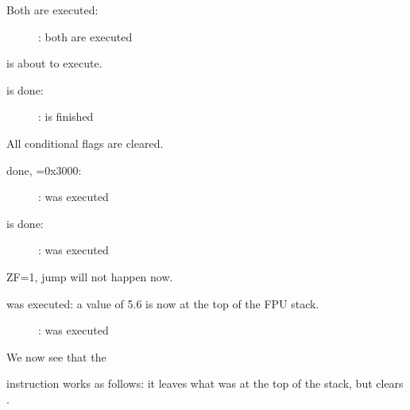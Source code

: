 \clearpage
{}

Both \FLD are executed:

\begin{figure}[H]
\centering
{}
\caption{\olly: both \FLD are executed}
\label{fig:FPU_comparison_Ox_case2_olly1}
\end{figure}

\FCOM is about to execute.

\clearpage
\FCOM is done:

\begin{figure}[H]
\centering
{}
\caption{\olly: \FCOM is finished}
\label{fig:FPU_comparison_Ox_case2_olly2}
\end{figure}

All conditional flags are cleared.

\clearpage
\FNSTSW done, =0x3000:

\begin{figure}[H]
\centering
{}
\caption{\olly: \FNSTSW was executed}
\label{fig:FPU_comparison_Ox_case2_olly3}
\end{figure}

\clearpage
\TEST is done:

\begin{figure}[H]
\centering
{}
\caption{\olly: \TEST was executed}
\label{fig:FPU_comparison_Ox_case2_olly4}
\end{figure}

ZF=1, jump will not happen now.

\clearpage
\FSTP {} was executed: a value of 5.6 is now at the top of the FPU stack.

\begin{figure}[H]
\centering
{}
\caption{\olly: \FSTP was executed}
\label{fig:FPU_comparison_Ox_case2_olly5}
\end{figure}

We now see that the \FSTP {} 

instruction works as follows: it leaves what was at the top of the stack, but clears .

